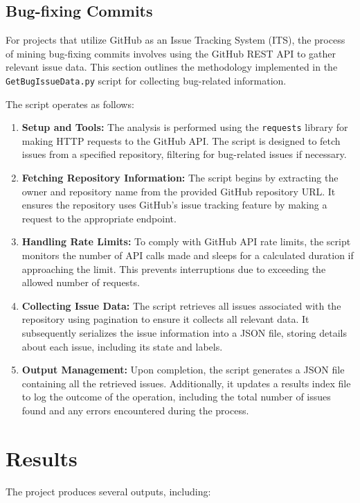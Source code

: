 \documentclass[sigconf]{acmart}
\begin{document}
\subsection{Bug-fixing Commits}
For projects that utilize GitHub as an Issue Tracking System (ITS), the process of mining bug-fixing commits involves using the GitHub REST API to gather relevant issue data. This section outlines the methodology implemented in the \texttt{GetBugIssueData.py} script for collecting bug-related information.

The script operates as follows:

\begin{enumerate}
    \item \textbf{Setup and Tools:} The analysis is performed using the \texttt{requests} library for making HTTP requests to the GitHub API. The script is designed to fetch issues from a specified repository, filtering for bug-related issues if necessary.

    \item \textbf{Fetching Repository Information:} The script begins by extracting the owner and repository name from the provided GitHub repository URL. It ensures the repository uses GitHub's issue tracking feature by making a request to the appropriate endpoint.

    \item \textbf{Handling Rate Limits:} To comply with GitHub API rate limits, the script monitors the number of API calls made and sleeps for a calculated duration if approaching the limit. This prevents interruptions due to exceeding the allowed number of requests.

    \item \textbf{Collecting Issue Data:} The script retrieves all issues associated with the repository using pagination to ensure it collects all relevant data. It subsequently serializes the issue information into a JSON file, storing details about each issue, including its state and labels.

    \item \textbf{Output Management:} Upon completion, the script generates a JSON file containing all the retrieved issues. Additionally, it updates a results index file to log the outcome of the operation, including the total number of issues found and any errors encountered during the process.
\end{enumerate}

\section{Results}
The project produces several outputs, including:
\end{document}
